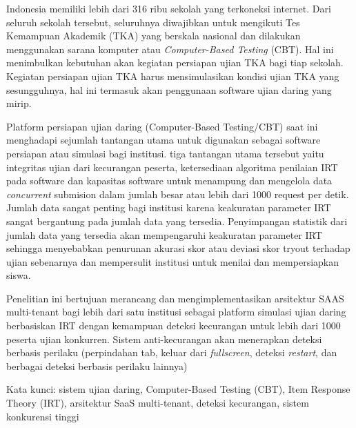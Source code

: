 \documentclass[proposal,indonesia]{ugmskripsi}
\begin{document}
\cover
\titlepageind
\approvalpage

\tableofcontents

\abstractind

Indonesia memiliki lebih dari 316 ribu sekolah yang terkoneksi internet\cite{indonesiabaikRibuSekolah}. Dari seluruh sekolah tersebut,
seluruhnya diwajibkan untuk mengikuti Tes Kemampuan Akademik (TKA) yang berskala nasional dan dilakukan
menggunakan sarana komputer atau \emph{Computer-Based Testing} (CBT). Hal ini menimbulkan kebutuhan akan 
kegiatan persiapan ujian TKA bagi tiap sekolah. Kegiatan persiapan ujian TKA harus mensimulasikan kondisi 
ujian TKA yang sesungguhnya, hal ini termasuk akan penggunaan software ujian daring yang mirip.

Platform persiapan ujian daring (Computer-Based Testing/CBT) saat ini menghadapi sejumlah tantangan utama untuk digunakan 
sebagai software persiapan atau simulasi bagi institusi. tiga tantangan utama tersebut yaitu integritas ujian dari kecurangan 
peserta, ketersediaan algoritma penilaian IRT pada software dan kapasitas software untuk menampung dan mengelola data 
\emph{concurrent} submision dalam jumlah besar atau lebih dari 1000 request per detik. Jumlah data sangat penting bagi 
institusi karena keakuratan parameter IRT sangat bergantung pada jumlah data yang tersedia. 
Penyimpangan statistik dari jumlah data yang tersedia akan mempengaruhi keakuratan parameter IRT sehingga menyebabkan
penurunan akurasi skor atau deviasi skor tryout terhadap ujian sebenarnya dan mempersulit institusi untuk 
menilai dan mempersiapkan siswa.

Penelitian ini bertujuan merancang dan mengimplementasikan arsitektur SAAS multi-tenant bagi lebih dari satu institusi 
sebagai platform simulasi ujian daring berbasiskan IRT dengan kemampuan deteksi kecurangan untuk lebih dari 1000 
peserta ujian konkurren. Sistem anti-kecurangan akan menerapkan deteksi berbasis perilaku (perpindahan tab,
keluar dari \emph{fullscreen}, deteksi \emph{restart}, dan berbagai deteksi berbasis perilaku lainnya)

Kata kunci: sistem ujian daring, Computer-Based Testing (CBT), Item Response Theory (IRT), arsitektur SaaS multi-tenant, deteksi kecurangan, sistem konkurensi tinggi
\endabstractind
\end{document}
